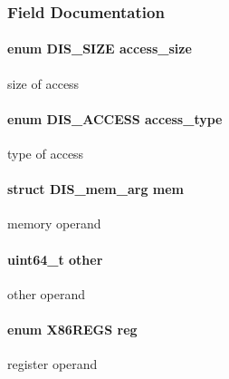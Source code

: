\subsubsection{Field Documentation}
\hypertarget{struct_d_i_s__arg_abe85ed51a3596cdb3a868a284c3d961f}{
\paragraph[{access\-\_\-size}]{\setlength{\rightskip}{0pt plus 5cm}enum {\bf D\-I\-S\-\_\-\-S\-I\-Z\-E} access\-\_\-size}}\label{struct_d_i_s__arg_abe85ed51a3596cdb3a868a284c3d961f}
size of access \hypertarget{struct_d_i_s__arg_a5a7d33b48f73c1d560377f10471d8b00}{
\paragraph[{access\-\_\-type}]{\setlength{\rightskip}{0pt plus 5cm}enum {\bf D\-I\-S\-\_\-\-A\-C\-C\-E\-S\-S} access\-\_\-type}}\label{struct_d_i_s__arg_a5a7d33b48f73c1d560377f10471d8b00}
type of access \hypertarget{struct_d_i_s__arg_a883edefb091b4875ffd7bb1f1e61dea3}{
\paragraph[{mem}]{\setlength{\rightskip}{0pt plus 5cm}struct {\bf D\-I\-S\-\_\-mem\-\_\-arg} mem}}\label{struct_d_i_s__arg_a883edefb091b4875ffd7bb1f1e61dea3}
memory operand \hypertarget{struct_d_i_s__arg_aabf8b24bd58cc13ea953e9add24d4387}{
\paragraph[{other}]{\setlength{\rightskip}{0pt plus 5cm}uint64\-\_\-t other}}\label{struct_d_i_s__arg_aabf8b24bd58cc13ea953e9add24d4387}
other operand \hypertarget{struct_d_i_s__arg_a426daf7e6de8cea3128731107457d2cf}{
\paragraph[{reg}]{\setlength{\rightskip}{0pt plus 5cm}enum {\bf X86\-R\-E\-G\-S} reg}}\label{struct_d_i_s__arg_a426daf7e6de8cea3128731107457d2cf}
register operand 